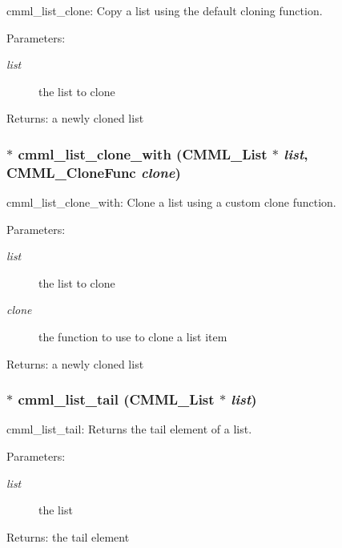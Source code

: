 cmml\_\-list\_\-clone: Copy a list using the default cloning function.

\begin{Desc}
\item[Parameters:]
\begin{description}
\item[{\em list}]the list to clone\end{description}
\end{Desc}
\begin{Desc}
\item[Returns:]a newly cloned list \end{Desc}
\subsubsection{$\ast$ cmml\_\-list\_\-clone\_\-with ({\bf CMML\_\-List} $\ast$ {\em list}, {\bf CMML\_\-Clone\-Func} {\em clone})}\label{cmml_8h_a84}


cmml\_\-list\_\-clone\_\-with: Clone a list using a custom clone function.

\begin{Desc}
\item[Parameters:]
\begin{description}
\item[{\em list}]the list to clone \item[{\em clone}]the function to use to clone a list item\end{description}
\end{Desc}
\begin{Desc}
\item[Returns:]a newly cloned list \end{Desc}
\subsubsection{$\ast$ cmml\_\-list\_\-tail ({\bf CMML\_\-List} $\ast$ {\em list})}\label{cmml_8h_a85}


cmml\_\-list\_\-tail: Returns the tail element of a list.

\begin{Desc}
\item[Parameters:]
\begin{description}
\item[{\em list}]the list\end{description}
\end{Desc}
\begin{Desc}
\item[Returns:]the tail element \end{Desc}
